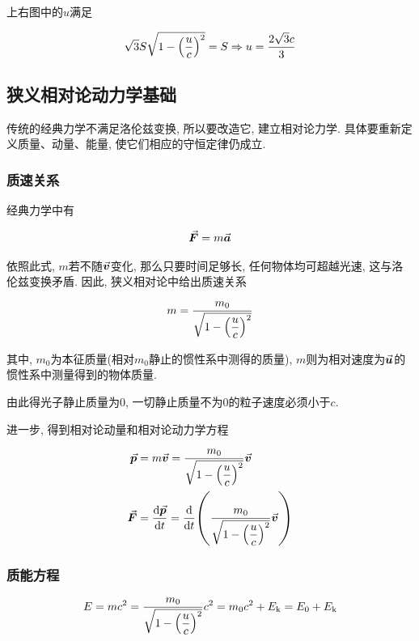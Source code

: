 上右图中的$u$满足

\begin{equation*}
	\sqrt{3} S \sqrt{1 - \qty(\dfrac{u}{c})^2} = S \Rightarrow u = \dfrac{2\sqrt{3}c}{3}
\end{equation*}

\subsection{狭义相对论动力学基础}

传统的经典力学不满足洛伦兹变换, 所以要改造它, 建立相对论力学. 具体要重新定义质量、动量、能量, 使它们相应的守恒定律仍成立. 

\subsubsection{质速关系}

经典力学中有

\begin{equation}
	\va*{F} = m \va*{a} \label{C6-eq22}
\end{equation}

依照此式, $m$若不随$\va*{v}$变化, 那么只要时间足够长, 任何物体均可超越光速, 这与洛伦兹变换矛盾. 因此, 狭义相对论中给出质速关系

\begin{equation}
	m = \dfrac{m_0}{\sqrt{1 - \qty(\dfrac{u}{c})^2} \label{C6-eq23}}
\end{equation}

其中, $m_0$为本征质量(相对$m_0$静止的惯性系中测得的质量), $m$则为相对速度为$\va*{u}$的惯性系中测量得到的物体质量. 

由此得光子静止质量为0, 一切静止质量不为0的粒子速度必须小于$c$. 

进一步, 得到相对论动量和相对论动力学方程

\begin{align}
	\va*{p} &= m \va*{v} = \dfrac{m_0}{\sqrt{1 - \qty(\dfrac{u}{c})^2}} \va*{v} \label{C6-eq24} \\
	\va*{F} &= \dv{\va*{p}}{t} = \dv{t}(\dfrac{m_0}{\sqrt{1 - \qty(\dfrac{u}{c})^2}} \va*{v}) \label{C6-eq25}
\end{align}

\subsubsection{质能方程}

\begin{equation}
	E = mc^2 = \dfrac{m_0}{\sqrt{1 - \qty(\dfrac{u}{c})^2}} c^2 = m_0 c^2 + E_{\textrm{k}} = E_0 + E_{\textrm{k}} \label{C6-eq26}
\end{equation}

